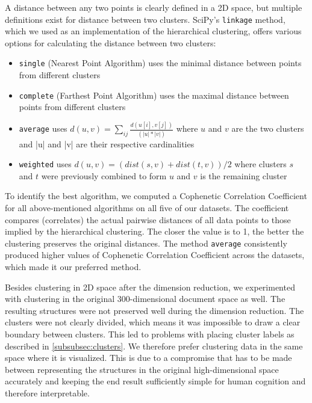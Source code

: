 A distance between any two points is clearly defined in a 2D space, but multiple definitions exist for distance between two clusters.
SciPy's \verb|linkage| method, which we used as an implementation of the hierarchical clustering, offers various options for calculating the distance between two clusters:
\begin{itemize}
	\item \verb|single| (Nearest Point Algorithm) uses the minimal distance between points from different clusters
	\item \verb|complete| (Farthest Point Algorithm) uses the maximal distance between points from different clusters
	\item \verb|average| uses $d(u, v)=\sum_{i j} \frac{d(u[i], v[j])}{(|u| *|v|)}$ where $u$ and $v$ are the two clusters and |u| and |v| are their respective cardinalities
	\item \verb|weighted| uses $d(u, v)=(d i s t(s, v)+d i s t(t, v)) / 2$ where clusters $s$ and $t$ were previously combined to form $u$ and $v$ is the remaining cluster
\end{itemize}

To identify the best algorithm, we computed a Cophenetic Correlation Coefficient \cite{sokal} for all above-mentioned algorithms on all five of our datasets.
The coefficient compares (correlates) the actual pairwise distances of all data points to those implied by the hierarchical clustering. 
The closer the value is to 1, the better the clustering preserves the original distances. 
The method \verb|average| consistently produced higher values of Cophenetic Correlation Coefficient across the datasets, which made it our preferred method.

Besides clustering in 2D space after the dimension reduction, we experimented with clustering in the original 300-dimensional document space as well.
The resulting structures were not preserved well during the dimension reduction.
The clusters were not clearly divided, which means it was impossible to draw a clear boundary between clusters.
This led to problems with placing cluster labels as described in \autoref{subsubsec:clusters}.
We therefore prefer clustering data in the same space where it is visualized.
This is due to a compromise that has to be made between representing the structures in the original high-dimensional space accurately and keeping the end result sufficiently simple for human cognition and therefore interpretable.


